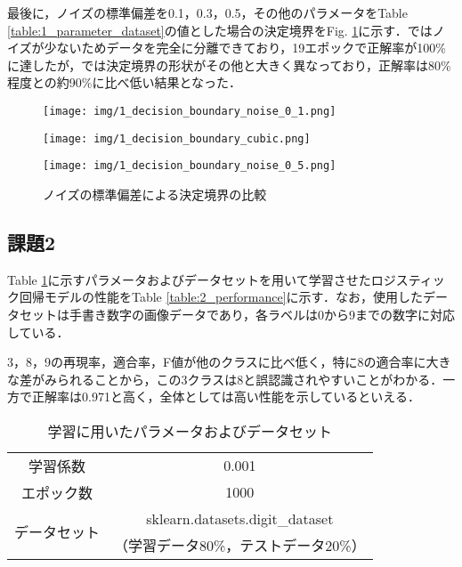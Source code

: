 \documentclass[a4paper,12pt]{jsarticle}
\renewcommand{\figurename}{Fig. }
\renewcommand{\tablename}{Table }
\begin{document}
最後に，ノイズの標準偏差を0.1，0.3，0.5，その他のパラメータを\tablename\ref{table:1_parameter_dataset}の値とした場合の決定境界を\figurename\ref{fig:1_decision_boundary_noise}に示す．ではノイズが少ないためデータを完全に分離できており，19エポックで正解率が100\%に達したが，では決定境界の形状がその他と大きく異なっており，正解率は80\%程度との約90\%に比べ低い結果となった．

\begin{figure}[htbp]
  \centering
  \begin{minipage}[b]{0.25\linewidth}
    \centering
    \texttt{[image: img/1\_decision\_boundary\_noise\_0\_1.png]}
    \label{fig:1_decision_boundary_noise_0_1}
  \end{minipage}
  \begin{minipage}[b]{0.25\linewidth}
    \centering
    \texttt{[image: img/1\_decision\_boundary\_cubic.png]}
    \label{fig:1_decision_boundary_noise_0_3}
  \end{minipage}
  \begin{minipage}[b]{0.25\linewidth}
    \centering
    \texttt{[image: img/1\_decision\_boundary\_noise\_0\_5.png]}
    \label{fig:1_decision_boundary_noise_0_5}
  \end{minipage}
  \caption{ノイズの標準偏差による決定境界の比較}
  \label{fig:1_decision_boundary_noise}
\end{figure}

\subsection*{課題2}

\tablename\ref{table:2_parameter_dataset}に示すパラメータおよびデータセットを用いて学習させたロジスティック回帰モデルの性能を\tablename\ref{table:2_performance}に示す．なお，使用したデータセットは手書き数字の画像データであり，各ラベルは0から9までの数字に対応している．

3，8，9の再現率，適合率，F値が他のクラスに比べ低く，特に8の適合率に大きな差がみられることから，この3クラスは8と誤認識されやすいことがわかる．一方で正解率は0.971と高く，全体としては高い性能を示しているといえる．

\begin{table}[htbp]
  \centering
  \caption{学習に用いたパラメータおよびデータセット}
  \label{table:2_parameter_dataset}
  \begin{tabular}{cc}
    \toprule
    学習係数                    & 0.001                           \\
    エポック数                   & 1000                            \\
    \midrule
    \multirow{2}{*}{データセット} & sklearn.datasets.digit\_dataset \\
                            & （学習データ80\%，テストデータ20\%）          \\
    \bottomrule
  \end{tabular}
\end{table}
\end{document}
